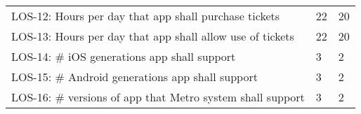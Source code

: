 \begin{table}[h]
\begin{tabularx}{\textwidth}{Xll}
    LOS-12: Hours per day that app shall purchase tickets                                                     & 22            & 20             \\
    LOS-13: Hours per day that app shall allow use of tickets                                                 & 22            & 20             \\
    LOS-14: \# iOS generations app shall support                                                               & 3             & 2              \\
    LOS-15: \# Android generations app shall support                                                           & 3             & 2              \\
    LOS-16: \# versions of app that Metro system shall support                                                 & 3             & 2              \\
    \hline
    \end{tabularx}
\end{table}